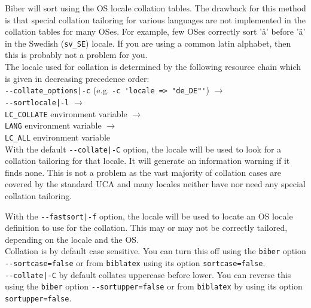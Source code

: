 \documentclass{ltxdockit}
\def\biberex#1{\hbox{\hspace{-4em}\texttt{\small \detokenize{#1}}}}
\begin{document}
\biberex{--fastsort|-f}
  \noindent Biber will sort using
  the OS locale collation tables. The drawback for this method is that special
  collation tailoring for various languages are not implemented in the
  collation tables for many OSes. For example, few OSes correctly sort 'å'
  before 'ä' in the Swedish (\verb+sv_SE+) locale. If you are using a
  common latin alphabet, then this is probably not a problem for you.\\[2ex]

\noindent The locale used for collation is determined by the following resource
chain which is given in decreasing precedence order:\\[2ex]

\noindent\verb+--collate_options|-c+ (e.g. \verb+-c 'locale => "de_DE"'+) $\rightarrow$\\
\hspace*{1em}\verb+--sortlocale|-l+ $\rightarrow$\\
\hspace*{2em}\verb+LC_COLLATE+ environment variable $\rightarrow$\\
\hspace*{3em}\verb+LANG+ environment variable $\rightarrow$\\
\hspace*{4em}\verb+LC_ALL+ environment variable\\[2ex]

\noindent With the default \verb+--collate|-C+ option, the locale will
be used to look for a collation tailoring for that locale. It will generate an
information warning if it finds none. This is not a problem as the vast
majority of collation cases are covered by the standard UCA and many
locales neither have nor need any special collation tailoring.

With the \verb+--fastsort|-f+ option, the locale will be
used to locate an OS locale definition to use for the collation. This
may or may not be correctly tailored, depending on the locale and the OS.\\[1ex]

\noindent Collation is by default case sensitive. You can turn this
off using the \verb+biber+ option \verb+--sortcase=false+ or from
\verb+biblatex+ using its option \verb+sortcase=false+.\\[1ex]

\noindent\verb+--collate|-C+ by default collates uppercase before
lower. You can reverse this using the \verb+biber+ option \verb+--sortupper=false+
or from \verb+biblatex+ by using its option \verb+sortupper=false+.\\[1ex]
\end{document}
